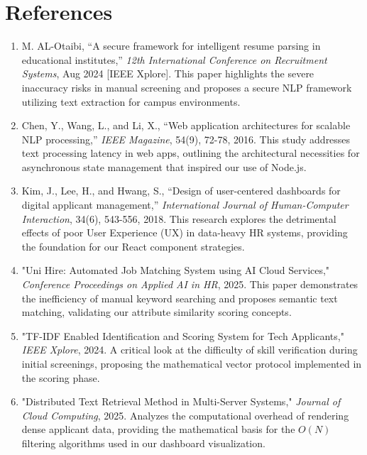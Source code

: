 \documentclass[12pt,a4paper]{report}
\begin{document}

\setlength{\parskip}{1em}
\renewcommand{\baselinestretch}{1.5}

\chapter*{References}

\begin{enumerate}

\item M. AL-Otaibi, 
“A secure framework for intelligent resume parsing in educational institutes,” \textit{12th International Conference on Recruitment Systems}, Aug 2024 [IEEE Xplore]. This paper highlights the severe inaccuracy risks in manual screening and proposes a secure NLP framework utilizing text extraction for campus environments.

\item Chen, Y., Wang, L., and Li, X.,
“Web application architectures for scalable NLP processing,” \textit{IEEE Magazine}, 54(9), 72-78, 2016. This study addresses text processing latency in web apps, outlining the architectural necessities for asynchronous state management that inspired our use of Node.js.

\item Kim, J., Lee, H., and Hwang, S., 
“Design of user-centered dashboards for digital applicant management,” \textit{International Journal of Human-Computer Interaction}, 34(6), 543-556, 2018. This research explores the detrimental effects of poor User Experience (UX) in data-heavy HR systems, providing the foundation for our React component strategies.

\item "Uni Hire: Automated Job Matching System using AI Cloud Services," \textit{Conference Proceedings on Applied AI in HR}, 2025. This paper demonstrates the inefficiency of manual keyword searching and proposes semantic text matching, validating our attribute similarity scoring concepts.

\item "TF-IDF Enabled Identification and Scoring System for Tech Applicants," \textit{IEEE Xplore}, 2024. A critical look at the difficulty of skill verification during initial screenings, proposing the mathematical vector protocol implemented in the scoring phase.

\item "Distributed Text Retrieval Method in Multi-Server Systems," \textit{Journal of Cloud Computing}, 2025. Analyzes the computational overhead of rendering dense applicant data, providing the mathematical basis for the $O(N)$ filtering algorithms used in our dashboard visualization.


\end{enumerate}
\end{document}
